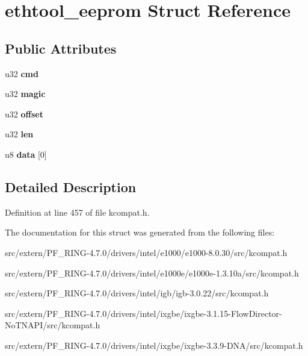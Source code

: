 \hypertarget{structethtool__eeprom}{
\section{ethtool\_\-eeprom Struct Reference}
\label{structethtool__eeprom}
}
\subsection*{Public Attributes}
\begin{DoxyCompactItemize}
\item 
\hypertarget{structethtool__eeprom_abd15b6e31222226ab2021e2862841f23}{
u32 {\bfseries cmd}}
\label{structethtool__eeprom_abd15b6e31222226ab2021e2862841f23}

\item 
\hypertarget{structethtool__eeprom_a7ed3727a1a9627978c0868b98886e57f}{
u32 {\bfseries magic}}
\label{structethtool__eeprom_a7ed3727a1a9627978c0868b98886e57f}

\item 
\hypertarget{structethtool__eeprom_ab4b0fd895378ef6aa63a273f1ad708a5}{
u32 {\bfseries offset}}
\label{structethtool__eeprom_ab4b0fd895378ef6aa63a273f1ad708a5}

\item 
\hypertarget{structethtool__eeprom_a75975e83d7503e5916a7971f91e786d6}{
u32 {\bfseries len}}
\label{structethtool__eeprom_a75975e83d7503e5916a7971f91e786d6}

\item 
\hypertarget{structethtool__eeprom_a1cb0432c57c6f47acda2e86d8abfca5f}{
u8 {\bfseries data} \mbox{[}0\mbox{]}}
\label{structethtool__eeprom_a1cb0432c57c6f47acda2e86d8abfca5f}

\end{DoxyCompactItemize}


\subsection{Detailed Description}


Definition at line 457 of file kcompat.h.



The documentation for this struct was generated from the following files:\begin{DoxyCompactItemize}
\item 
src/extern/PF\_\-RING-\/4.7.0/drivers/intel/e1000/e1000-\/8.0.30/src/kcompat.h\item 
src/extern/PF\_\-RING-\/4.7.0/drivers/intel/e1000e/e1000e-\/1.3.10a/src/kcompat.h\item 
src/extern/PF\_\-RING-\/4.7.0/drivers/intel/igb/igb-\/3.0.22/src/kcompat.h\item 
src/extern/PF\_\-RING-\/4.7.0/drivers/intel/ixgbe/ixgbe-\/3.1.15-\/FlowDirector-\/NoTNAPI/src/kcompat.h\item 
src/extern/PF\_\-RING-\/4.7.0/drivers/intel/ixgbe/ixgbe-\/3.3.9-\/DNA/src/kcompat.h\end{DoxyCompactItemize}
